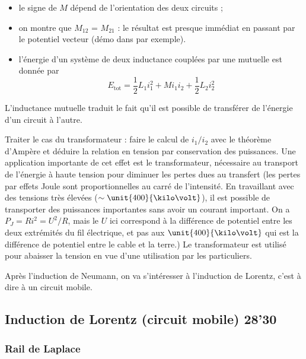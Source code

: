 \begin{remarque}
\begin{itemize}
\item le signe de $M$ dépend de l'orientation des deux circuits ;
\item on montre que $M_{12}$ = $M_{21}$ : le résultat est presque immédiat en passant par le potentiel vecteur (démo dans \cite{Perez2009} par exemple).
\item l'énergie d'un système de deux inductance couplées par une mutuelle est donnée par 
\begin{equation}
E_\mathrm{tot} = \frac{1}{2}L_1 i_1^2 + M i_1 i_2 + \frac{1}{2}L_2 i_2^2
\end{equation}
\end{itemize}
\end{remarque}

L'inductance mutuelle traduit le fait qu'il est possible de transférer de l'énergie d'un circuit à l'autre.

Traiter le cas du transformateur : faire le calcul de $i_1/i_2$ avec le théorème d'Ampère et déduire la relation en tension par conservation des puissances.
Une application importante de cet effet est le transformateur, nécessaire au transport de l'énergie à haute tension pour diminuer les pertes dues au transfert (les pertes par effets Joule sont proportionnelles au carré de l'intensité.
En travaillant avec des tensions très élevées ($\sim \unit{400}{\kilo\volt}$), il est possible de transporter des puissances importantes sans avoir un courant important.
On a $P_J = Ri^2 = U^2/R$, mais le $U$ ici correspond à la différence de potentiel entre les deux extrémités du fil électrique, et pas aux $\unit{400}{\kilo\volt}$ qui est la différence de potentiel entre le cable et la terre.)
Le transformateur est utilisé pour abaisser la tension en vue d'une utilisation par les particuliers.

\begin{transition}
Après l'induction de Neumann, on va s'intéresser à l'induction de Lorentz, c'est à dire à un circuit mobile.
\end{transition}

\subsection{Induction de Lorentz (circuit mobile) 28'30}

\subsubsection{Rail de Laplace}


